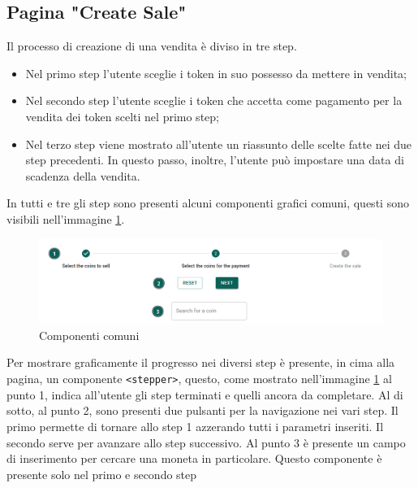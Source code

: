 \documentclass[a4paper]{article}
\begin{document}
        \subsection{Pagina "Create Sale"}
        Il processo di creazione di una vendita è diviso in tre step.
        \begin{itemize}
          \item Nel primo step l'utente sceglie i token in suo possesso da mettere in vendita;
          \item Nel secondo step l'utente sceglie i token che accetta come pagamento per la vendita dei token scelti nel primo step;
          \item Nel terzo step viene mostrato all'utente un riassunto delle scelte fatte nei due step precedenti. In questo passo, inoltre, l'utente può
                impostare una data di scadenza della vendita.
        \end{itemize}
        In tutti e tre gli step sono presenti alcuni componenti grafici comuni, questi sono visibili nell'immagine \ref{fig:commonComponents}.
        \begin{figure}[H]
          \includegraphics[width=\textwidth]{commonComponents.png}
          \caption{Componenti comuni}
          \centering
          \label{fig:commonComponents}
        \end{figure}
        Per mostrare graficamente il progresso nei diversi step è presente, in cima alla pagina, un componente
        \verb|<stepper>|, questo, come mostrato nell'immagine \ref{fig:commonComponents} al punto 1, indica all'utente gli step terminati e quelli ancora da completare.
        \newline
        Al di sotto, al punto 2, sono presenti due pulsanti per la navigazione nei vari step. Il primo permette di tornare allo step 1 azzerando tutti i parametri inseriti.
        Il secondo serve per avanzare allo step successivo.
        \newline
        Al punto 3 è presente un campo di inserimento per cercare una moneta in particolare. Questo componente è presente solo nel primo e secondo step
\end{document}
